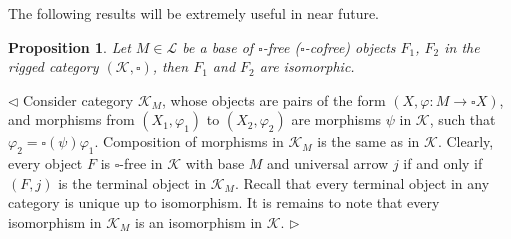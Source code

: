 \documentclass[12pt]{article}
\newtheorem{proposition}[theorem]{Proposition}
\newenvironment{proof}{\par $\triangleleft$}{$\triangleright$}
\begin{document}
The following results will be extremely useful in near future.

\begin{proposition}\label{PrUniqFr}
Let $M\in\mathcal{L}$ be a base of $\square$-free ($\square$-cofree) 
objects $F_1$, $F_2$ in the rigged category $(\mathcal{K},\square)$, 
then $F_1$ and $F_2$ are isomorphic.  
\end{proposition}
\begin{proof}
Consider category $\mathcal{K}_M$, whose objects are pairs of the form 
$(X,\varphi:M\to\square X)$, and morphisms from $(X_1,\varphi_1)$ to 
$(X_2,\varphi_2)$ are morphisms $\psi$ in 
$\mathcal{K}$, such that $\varphi_2=\square(\psi)\varphi_1$. Composition of 
morphisms in $\mathcal{K}_M$ is the same as in $\mathcal{K}$. Clearly, every 
object $F$ is $\square$-free in $\mathcal{K}$ with base $M$ and universal 
arrow $j$ if and only if $(F,j)$ is the terminal object in $\mathcal{K}_M$. 
Recall that every terminal object in any category is unique up to isomorphism. 
It is remains to note that every isomorphism in $\mathcal{K}_M$ is an 
isomorphism in $\mathcal{K}$.
\end{proof}
\end{document}
